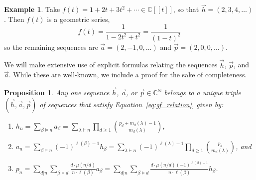 \documentclass[11pt]{amsart}
\newtheorem{proposition}[theorem]{Proposition}
\theoremstyle{definition}
\newtheorem{example}[theorem]{Example}
\numberwithin{equation}{section}
\def\NN{{\mathbb N}}
\def\CC{{\mathbb C}}
\begin{document}
\begin{example}
Take $f(t) = 1 + 2t + 3 t^{2} + \cdots \in \CC[[t]]$, so that $\vec{h} = (2, 3, 4, \ldots)$.  Then $f(t)$ is a geometric series,
\[
f(t) = \frac{1}{1 - 2 t^{2} + t^{2}} = \frac{1}{(1-t)^{2}}
\]
so the remaining sequences are $\vec{a} = (2, -1, 0, \ldots)$ and $\vec{p} = (2, 0, 0, \ldots)$.
\end{example}

We will make extensive use of explicit formulas relating the sequences $\vec{h}$, $\vec{p}$, and $\vec{a}$.  While these are well-known, we include a proof for the sake of completeness.

\begin{proposition}
\label{prop:sequences}
Any one sequence $\vec{h}$, $\vec{a}$, or $\vec{p} \in \CC^{\NN}$ belongs to a unique triple $(\vec{h}, \vec{a}, \vec{p})$ of sequences that satisfy Equation~\eqref{eq:gf_relation}, given by:
\begin{enumerate}[label = (\roman*), itemsep = 1em]
\item $\displaystyle h_{n}
= \sum_{\beta \vDash n} a_\beta
= \sum_{\lambda \vdash n} \prod_{d \geq 1} \binom{p_d + m_d(\lambda) -1}{m_d(\lambda)}$, 

\item $\displaystyle a_n
= \sum_{\beta \vDash n} (-1)^{\ell(\beta)-1} h_\beta
= \sum_{\lambda \vdash n} (-1)^{\ell(\lambda)-1} \prod_{d \geq 1} \binom{p_d}{m_d(\lambda)}$, and

\item $\displaystyle p_n
= \sum_{d|n} \sum_{\beta \vDash d} \frac{d\cdot \mu(n/d)}{n \cdot \ell(\beta)} a_\beta
= \sum_{d|n} \sum_{\beta \vDash d} \frac{d\cdot \mu(n/d) (-1)^{\ell(\beta)-1}}{n \cdot \ell(\beta)} h_\beta$.

\end{enumerate}
\end{proposition}
\end{document}
